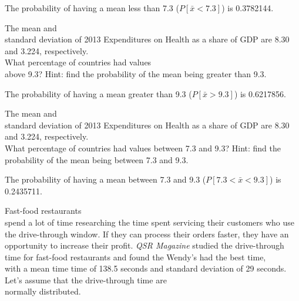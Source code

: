 \documentclass[11pt]{book}\usepackage[]{graphicx}\usepackage[]{color}
\begin{document}
\begin{exercises}
\begin{exercise}
	  \end{exercise}
	  \vspace{2cm}
	  \begin{solution}   %



    The probability of having a mean less than 7.3 ($P[ \bar{x} < 7.3 ]$) is 0.3782144.

	\end{solution}

			\begin{exercise}  %

	  The mean and \\ standard  deviation of 2013 Expenditures on Health as a share of GDP are 8.30 and 3.224, respectively.  \\ What percentage of countries had values \\ above 9.3?   Hint: find the probability of the mean being greater than 9.3.

	  \end{exercise}
	  \vspace{2cm}
	  \begin{solution}    %



    The probability of having a mean greater than 9.3 ($P[ \bar{x} > 9.3 ]$) is 0.6217856.

	\end{solution}

  		\begin{exercise}  %

	  The mean and \\ standard  deviation of 2013 Expenditures on Health as a share of GDP are 8.30 and 3.224, respectively.  \\ What percentage of countries had values between 7.3 and 9.3?   Hint: find the probability of the mean being between 7.3 and  9.3.

	  \end{exercise}
	  \begin{solution}    %



    The probability of having a mean between 7.3 and  9.3 ($P[ 7.3 < \bar{x} < 9.3 ]$) is 0.2435711.

	\end{solution}
	
\begin{exercise}   %



Fast-food restaurants \\ spend a lot of time researching the time spent servicing their customers who use the drive-through window.  If they can process their orders faster, they have an opportunity to increase their profit.  \textit{QSR Magazine} studied the drive-through time for fast-food restaurants and found the Wendy's had the best time, \\ with a mean  time time of 138.5 seconds and standard deviation of 29 seconds.  Let's assume that the drive-through time are \\ normally distributed. 


\end{exercise}
\end{exercises}
\end{document}

